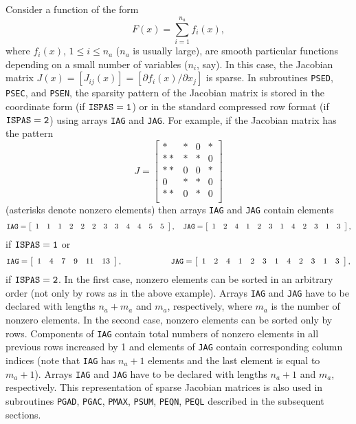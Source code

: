 \documentclass{esub2acm}
\newcommand{\beq}{\begin{eqnarray*}}
\newcommand{\eeq}{\end{eqnarray*}}
\begin{document}
\noindent Consider a function of the form
%
\begin{equation}
\label{3.6}
F(x) = \sum_{i=1}^{n_a} f_i(x),
\end{equation}
%
where $f_i(x)$, $1 \leq i \leq n_a$ ($n_a$ is usually large), are smooth particular
functions depending on a small number of variables ($n_i$, say). In this case,
the Jacobian matrix $J(x) = [J_{ij}(x)] = [\partial f_i(x)/\partial x_j]$ is
sparse. In subroutines {\tt PSED}, {\tt PSEC}, and {\tt PSEN}, the sparsity pattern
of the Jacobian matrix is stored in the coordinate form (if ${\tt ISPAS=1}$) or in
the standard compressed row format (if ${\tt ISPAS=2}$) using arrays {\tt IAG} and
{\tt JAG}. For example, if the Jacobian matrix has the pattern
%
$$J = \left[ \begin{array}{cccc}
  * & * & 0 & * \\
* * & * & * & 0 \\
* * & 0 & 0 & * \\
  0 & * & * & 0 \\
* * & 0 & * & 0 \\
\end{array} \right]$$
%
(asterisks denote nonzero elements) then arrays {\tt IAG} and {\tt JAG} contain
elements
%
\beq
{\tt IAG} = \left[ \begin{array}{cccccccccccc}
1 & 1 & 1 & 2 & 2 & 2 & 3 & 3 & 4 & 4 & 5 & 5
\end{array} \right], \quad
{\tt JAG} = \left[ \begin{array}{cccccccccccc}
1 & 2 & 4 & 1 & 2 & 3 & 1 & 4 & 2 & 3 & 1 & 3
\end{array} \right],
\eeq
%
if ${\tt ISPAS=1}$ or
%
\beq
{\tt IAG} = \left[ \begin{array}{cccccc}
1 & 4 & 7 & 9 & 11 & 13
\end{array} \right], \qquad \qquad \quad \quad
{\tt JAG} = \left[ \begin{array}{cccccccccccc}
1 & 2 & 4 & 1 & 2 & 3 & 1 & 4 & 2 & 3 & 1 & 3
\end{array} \right],
\eeq
%
if ${\tt ISPAS=2}$. In the first case, nonzero elements can be sorted in an
arbitrary order (not only by rows as in the above example). Arrays {\tt IAG}
and {\tt JAG} have to be declared with lengths $n_a+m_a$ and $m_a$, respectively,
where $m_a$ is the number of nonzero elements. In the second case, nonzero
elements can be sorted only by rows. Components of {\tt IAG} contain total
numbers of nonzero elements in all previous rows increased by 1 and elements
of {\tt JAG} contain corresponding column indices (note that {\tt IAG} has
$n_a+1$ elements and the last element is equal to $m_a+1$). Arrays {\tt IAG}
and {\tt JAG} have to be declared with lengths $n_a+1$ and $m_a$, respectively.
This representation of sparse Jacobian matrices is also used in subroutines
{\tt PGAD}, {\tt PGAC}, {\tt PMAX}, {\tt PSUM}, {\tt PEQN},
{\tt PEQL} described in the subsequent sections.
\end{document}
